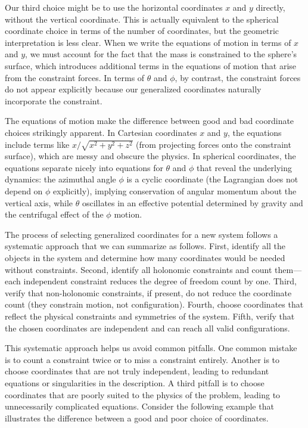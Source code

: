 Our third choice might be to use the horizontal coordinates $x$ and $y$ directly, without the vertical coordinate. This is actually equivalent to the spherical coordinate choice in terms of the number of coordinates, but the geometric interpretation is less clear. When we write the equations of motion in terms of $x$ and $y$, we must account for the fact that the mass is constrained to the sphere's surface, which introduces additional terms in the equations of motion that arise from the constraint forces. In terms of $\theta$ and $\phi$, by contrast, the constraint forces do not appear explicitly because our generalized coordinates naturally incorporate the constraint.

The equations of motion make the difference between good and bad coordinate choices strikingly apparent. In Cartesian coordinates $x$ and $y$, the equations include terms like $x / \sqrt{x^2 + y^2 + z^2}$ (from projecting forces onto the constraint surface), which are messy and obscure the physics. In spherical coordinates, the equations separate nicely into equations for $\theta$ and $\phi$ that reveal the underlying dynamics: the azimuthal angle $\phi$ is a cyclic coordinate (the Lagrangian does not depend on $\phi$ explicitly), implying conservation of angular momentum about the vertical axis, while $\theta$ oscillates in an effective potential determined by gravity and the centrifugal effect of the $\phi$ motion.

The process of selecting generalized coordinates for a new system follows a systematic approach that we can summarize as follows. First, identify all the objects in the system and determine how many coordinates would be needed without constraints. Second, identify all holonomic constraints and count them—each independent constraint reduces the degree of freedom count by one. Third, verify that non-holonomic constraints, if present, do not reduce the coordinate count (they constrain motion, not configuration). Fourth, choose coordinates that reflect the physical constraints and symmetries of the system. Fifth, verify that the chosen coordinates are independent and can reach all valid configurations.

This systematic approach helps us avoid common pitfalls. One common mistake is to count a constraint twice or to miss a constraint entirely. Another is to choose coordinates that are not truly independent, leading to redundant equations or singularities in the description. A third pitfall is to choose coordinates that are poorly suited to the physics of the problem, leading to unnecessarily complicated equations. Consider the following example that illustrates the difference between a good and poor choice of coordinates.

